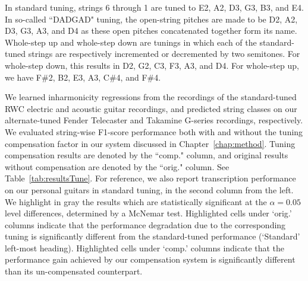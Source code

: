 \documentclass[12pt]{cmuthesis}
\begin{document}
In standard tuning, strings 6 through 1 are tuned to E2, A2, D3, G3, B3, and E4. In so-called ``DADGAD" tuning, the open-string pitches are made to be D2, A2, D3, G3, A3, and D4 as these open pitches concatenated together form its name. Whole-step up and whole-step down are tunings in which each of the standard-tuned strings are respectively incremented or decremented by two semitones. For whole-step down, this results in D2, G2, C3, F3, A3, and D4. For whole-step up, we have F\#2, B2, E3, A3, C\#4, and F\#4.

We learned inharmonicity regressions from the recordings of the standard-tuned RWC electric and acoustic guitar recordings, and predicted string classes on our alternate-tuned Fender Telecaster and Takamine G-series recordings, respectively. We evaluated string-wise F1-score performance both with and without the tuning compensation factor in our system discussed in Chapter~\ref{chap:method}. Tuning compensation results are denoted by the ``comp." column, and original results without compensation are denoted by the ``orig." column. See Table~\ref{tab:resultsTune}. For reference, we also report transcription performance on our personal guitars in standard tuning, in the second column from the left. We highlight in gray the results which are statistically significant at the $\alpha = 0.05$ level differences, determined by a McNemar test. Highlighted cells under `orig.' columns indicate that the performance degradation due to the corresponding tuning is significantly different from the standard-tuned performance (`Standard' left-most heading). Highlighted cells under `comp.' columns indicate that the performance gain achieved by our compensation system is significantly different than its un-compensated counterpart.
\end{document}
